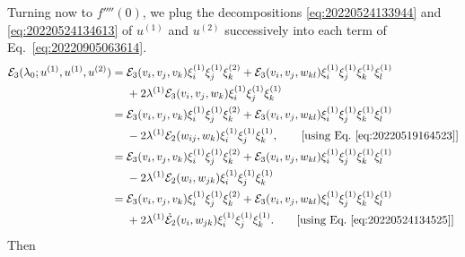 \documentclass[12pt, final]{scrartcl}
\theoremstyle{definition}
\newcommand{\E}{\mathcal E}
\newcommand{\order}[2][1]{#2^{(#1)}}
\begin{document}
Turning now to $f''''(0)$, we plug the decompositions \eqref{eq:20220524133944} and \eqref{eq:20220524134613} of
$\order[1]u$ and $\order[2]u$ successively into each term of Eq.~\eqref{eq:20220905063614}.
\begin{equation*}
  \begin{aligned}[b]
    \E_3(\lambda_0; \order[1]u, \order[1]u, \order[2]u)
    ={} & \E_3(v_i, v_j, v_k) \order[1]{\xi_i} \order[1]{\xi_j} \order[2]{\xi_k} + \E_3(v_i, v_j, w_{k l}) \order[1]{\xi_i} \order[1]{\xi_j} \order[1]{\xi_k} \order[1]{\xi_l}\\
    & + 2\order[1]\lambda \E_3(v_i, v_j, w_k) \order[1]{\xi_i} \order[1]{\xi_j} \order[1]{\xi_k} \\
    ={} & \E_3(v_i, v_j, v_k) \order[1]{\xi_i} \order[1]{\xi_j} \order[2]{\xi_k} + \E_3(v_i, v_j, w_{k l}) \order[1]{\xi_i} \order[1]{\xi_j} \order[1]{\xi_k} \order[1]{\xi_l}\\
    & - 2\order[1]\lambda \E_2(w_{ij}, w_k) \order[1]{\xi_i} \order[1]{\xi_j} \order[1]{\xi_k}, \qquad \text{[using Eq.~\eqref{eq:20220519164523}]}\\
    ={} & \E_3(v_i, v_j, v_k) \order[1]{\xi_i} \order[1]{\xi_j} \order[2]{\xi_k} + \E_3(v_i, v_j, w_{kl}) \order[1]{\xi_i} \order[1]{\xi_j} \order[1]{\xi_k} \order[1]{\xi_l}\\
    & - 2\order[1]\lambda \E_2(w_{i}, w_{jk}) \order[1]{\xi_i} \order[1]{\xi_j} \order[1]{\xi_k}\\
    ={} & \E_3(v_i, v_j, v_k) \order[1]{\xi_i} \order[1]{\xi_j} \order[2]{\xi_k} + \E_3(v_i, v_j, w_{kl}) \order[1]{\xi_i} \order[1]{\xi_j} \order[1]{\xi_k} \order[1]{\xi_l}\\
    & + 2 \order[1]\lambda \dot{\E}_2(v_{i}, w_{jk}) \order[1]{\xi_i} \order[1]{\xi_j} \order[1]{\xi_k}. \qquad \text{[using Eq.~\eqref{eq:20220524134525}]}
  \end{aligned}
\end{equation*}
Then
\end{document}
